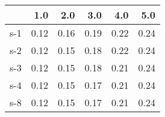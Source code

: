 \begin{tabular}{lrrrrr}
\toprule
{} &  1.0 &  2.0 &  3.0 &  4.0 &  5.0 \\
\midrule
s-1 & 0.12 & 0.16 & 0.19 & 0.22 & 0.24 \\
s-2 & 0.12 & 0.15 & 0.18 & 0.22 & 0.24 \\
s-3 & 0.12 & 0.15 & 0.18 & 0.21 & 0.24 \\
s-4 & 0.12 & 0.15 & 0.17 & 0.21 & 0.24 \\
s-8 & 0.12 & 0.15 & 0.17 & 0.21 & 0.24 \\
\bottomrule
\end{tabular}
